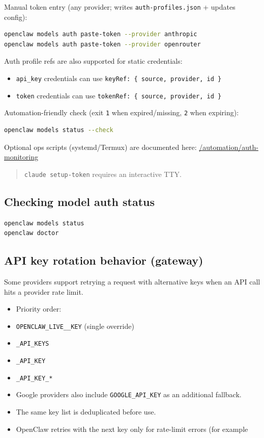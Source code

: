 Manual token entry (any provider; writes \texttt{auth-profiles.json} + updates config):

\begin{lstlisting}[language=bash]
openclaw models auth paste-token --provider anthropic
openclaw models auth paste-token --provider openrouter
\end{lstlisting}


Auth profile refs are also supported for static credentials:

\begin{itemize}
  \item \texttt{api\_key} credentials can use \texttt{keyRef: \{ source, provider, id \}}
  \item \texttt{token} credentials can use \texttt{tokenRef: \{ source, provider, id \}}
\end{itemize}


Automation-friendly check (exit \texttt{1} when expired/missing, \texttt{2} when expiring):

\begin{lstlisting}[language=bash]
openclaw models status --check
\end{lstlisting}


Optional ops scripts (systemd/Termux) are documented here:
\href{/automation/auth-monitoring}{/automation/auth-monitoring}

\begin{quote}
\texttt{claude setup-token} requires an interactive TTY.
\end{quote}


\subsection{Checking model auth status}


\begin{lstlisting}[language=bash]
openclaw models status
openclaw doctor
\end{lstlisting}


\subsection{API key rotation behavior (gateway)}


Some providers support retrying a request with alternative keys when an API call
hits a provider rate limit.

\begin{itemize}
  \item Priority order:
  \item \texttt{OPENCLAW\_LIVE\_\_KEY} (single override)
  \item \texttt{\_API\_KEYS}
  \item \texttt{\_API\_KEY}
  \item \texttt{\_API\_KEY\_*}
  \item Google providers also include \texttt{GOOGLE\_API\_KEY} as an additional fallback.
  \item The same key list is deduplicated before use.
  \item OpenClaw retries with the next key only for rate-limit errors (for example
\end{itemize}

